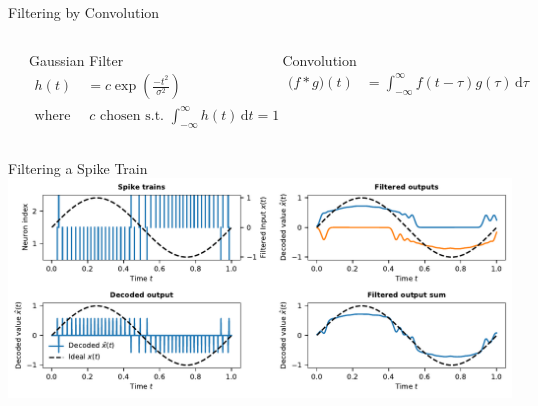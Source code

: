 \documentclass[handout,aspectratio=169]{beamer}
\begin{document}
\begin{frame}{Filtering by Convolution}
	\begin{columns}
		\includegraphics[width=\textwidth]{media/gaussian_filters.pdf}
		\begin{block}{Gaussian Filter}
			\begin{align*}
				h(t) &= c \exp \left( \frac{-t^2}{\sigma^2} \right) \\
				\text{where }  &~c \text{ chosen s.t. } {\textstyle \int_{-\infty}^\infty h(t) \,\mathrm{d}t = 1}
			\end{align*}
		\end{block}
		\begin{block}{Convolution}
			\begin{align*}
				\big( f \ast g \big)(t) &= \int_{-\infty}^{\infty} f(t - \tau) g(\tau) \,\mathrm{d}\tau
			\end{align*}
		\end{block}
	\end{columns}
\end{frame}

\begin{frame}{Filtering a Spike Train}
	\includegraphics[width=\textwidth]{media/two_neurons_filtered.pdf}
\end{frame}
\end{document}

